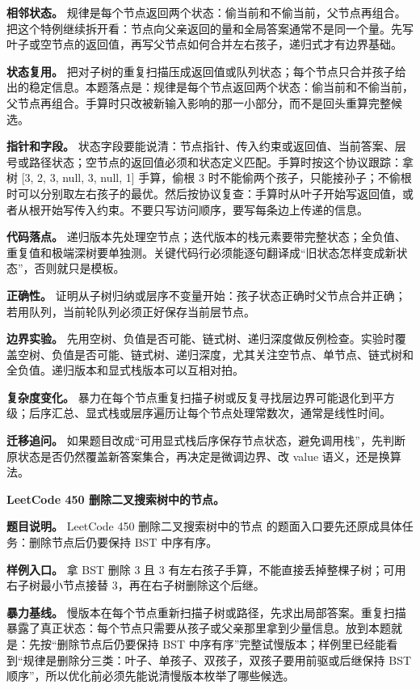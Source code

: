 \textbf{相邻状态。} 规律是每个节点返回两个状态：偷当前和不偷当前，父节点再组合。把这个特例继续拆开看：节点向父亲返回的量和全局答案通常不是同一个量。先写叶子或空节点的返回值，再写父节点如何合并左右孩子，递归式才有边界基础。

\textbf{状态复用。} 把对子树的重复扫描压成返回值或队列状态；每个节点只合并孩子给出的稳定信息。本题落点是：规律是每个节点返回两个状态：偷当前和不偷当前，父节点再组合。手算时只改被新输入影响的那一小部分，而不是回头重算完整候选。

\textbf{指针和字段。} 状态字段要能说清：节点指针、传入约束或返回值、当前答案、层号或路径状态；空节点的返回值必须和状态定义匹配。手算时按这个协议跟踪：拿树 [3, 2, 3, null, 3, null, 1] 手算，偷根 3 时不能偷两个孩子，只能接孙子；不偷根时可以分别取左右孩子的最优。然后按协议复查：手算时从叶子开始写返回值，或者从根开始写传入约束。不要只写访问顺序，要写每条边上传递的信息。

\textbf{代码落点。} 递归版本先处理空节点；迭代版本的栈元素要带完整状态；全负值、重复值和极端深树要单独测。关键代码行必须能逐句翻译成“旧状态怎样变成新状态”，否则就只是模板。

\textbf{正确性。} 证明从子树归纳或层序不变量开始：孩子状态正确时父节点合并正确；若用队列，当前轮队列必须正好保存当前层节点。

\textbf{边界实验。} 先用空树、负值是否可能、链式树、递归深度做反例检查。实验时覆盖空树、负值是否可能、链式树、递归深度，尤其关注空节点、单节点、链式树和全负值。递归版本和显式栈版本可以互相对拍。

\textbf{复杂度变化。} 暴力在每个节点重复扫描子树或反复寻找层边界可能退化到平方级；后序汇总、显式栈或层序遍历让每个节点处理常数次，通常是线性时间。

\textbf{迁移追问。} 如果题目改成“可用显式栈后序保存节点状态，避免调用栈”，先判断原状态是否仍然覆盖新答案集合，再决定是微调边界、改 value 语义，还是换算法。

\noindent\textbf{LeetCode 450 删除二叉搜索树中的节点。}

\textbf{题目说明。} LeetCode 450 删除二叉搜索树中的节点 的题面入口要先还原成具体任务：删除节点后仍要保持 BST 中序有序。

\textbf{样例入口。} 拿 BST 删除 3 且 3 有左右孩子手算，不能直接丢掉整棵子树；可用右子树最小节点接替 3，再在右子树删除这个后继。

\textbf{暴力基线。} 慢版本在每个节点重新扫描子树或路径，先求出局部答案。重复扫描暴露了真正状态：每个节点只需要从孩子或父亲那里拿到少量信息。放到本题就是：先按“删除节点后仍要保持 BST 中序有序”完整试慢版本；样例里已经能看到“规律是删除分三类：叶子、单孩子、双孩子，双孩子要用前驱或后继保持 BST 顺序”，所以优化前必须先能说清慢版本枚举了哪些候选。

